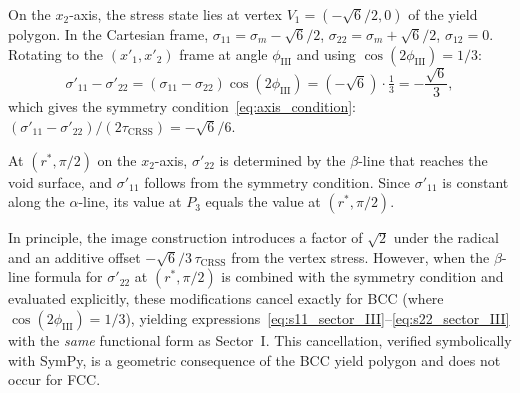 \documentclass{svjour3} %
\newcommand{\tcrss}{\tau_{\mathrm{CRSS}}}
\newcommand{\sm}{\sigma_m}
\begin{document}
\begin{appendices}
On the $x_2$-axis, the stress state lies at vertex
$V_1 = (-\sqrt{6}/2, 0)$ of the yield polygon. In the Cartesian frame,
$\sigma_{11} = \sm - \sqrt{6}/2$, $\sigma_{22} = \sm + \sqrt{6}/2$,
$\sigma_{12} = 0$. Rotating to the $(x'_1, x'_2)$ frame at angle
$\phi_{\mathrm{III}}$ and using $\cos(2\phi_{\mathrm{III}}) = 1/3$:
\begin{equation}
\sigma'_{11} - \sigma'_{22}
  = (\sigma_{11} - \sigma_{22})\cos(2\phi_{\mathrm{III}})
  = (-\sqrt{6})\cdot\tfrac{1}{3}
  = -\frac{\sqrt{6}}{3},
\end{equation}
which gives the symmetry condition~\eqref{eq:axis_condition}:
$(\sigma'_{11} - \sigma'_{22})/(2\tcrss) = -\sqrt{6}/6$.

At $(r^*, \pi/2)$ on the $x_2$-axis, $\sigma'_{22}$ is determined by
the $\beta$-line that reaches the void surface, and $\sigma'_{11}$
follows from the symmetry condition. Since $\sigma'_{11}$ is constant
along the $\alpha$-line, its value at $P_3$ equals the value at
$(r^*, \pi/2)$.

In principle, the image construction introduces a factor of $\sqrt{2}$
under the radical and an additive offset $-\sqrt{6}/3\,\tcrss$ from the
vertex stress. However, when the $\beta$-line formula for $\sigma'_{22}$
at $(r^*, \pi/2)$ is combined with the symmetry condition and evaluated
explicitly, these modifications cancel exactly for BCC
(where $\cos(2\phi_{\mathrm{III}}) = 1/3$), yielding
expressions~\eqref{eq:s11_sector_III}--\eqref{eq:s22_sector_III} with
the \emph{same} functional form as Sector~I. This cancellation,
verified symbolically with SymPy, is a geometric consequence of the BCC
yield polygon and does not occur for FCC.

\end{appendices}



\end{document}
